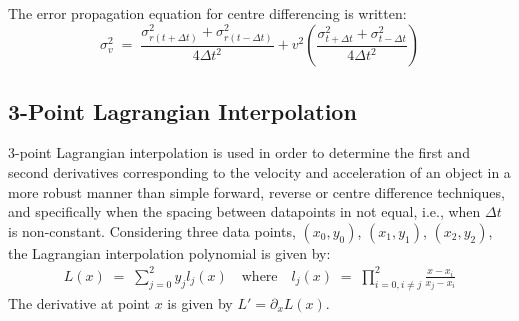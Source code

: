 \documentclass[namedreferences]{SolarPhysics}
\begin{document}
\begin{article}
The error propagation equation for centre differencing is written:
\begin{equation}
\sigma_v^2 \; = \; \frac{\sigma_{r(t+\Delta t)}^2+\sigma_{r(t-\Delta t)}^2}{4 \Delta t^2} + v^2 \left( \frac{\sigma_{t+\Delta t}^2+\sigma_{t-\Delta t}^2}{4 \Delta t^2} \right) %
\end{equation}


\subsection{3-Point Lagrangian Interpolation}
\label{sect_lagrangian}

3-point Lagrangian interpolation is used in order to determine the first and second derivatives corresponding to the velocity and acceleration of an object in a more robust manner than simple forward, reverse or centre difference techniques, and specifically when the spacing between datapoints in not equal, i.e., when $\Delta t$ is non-constant. Considering three data points, $(x_0, y_0)$, $(x_1, y_1)$, $(x_2, y_2)$, the Lagrangian interpolation polynomial is given by:
\begin{eqnarray}
L(x) \; =\; \sum_{j=0}^2 y_j l_j(x) \quad \mbox{where} \quad
l_j(x) \; =\; \prod_{i=0, i\neq j}^2 \frac{x-x_i}{x_j-x_i} 
\end{eqnarray}
The derivative at point $x$ is given by $L'=\partial_x L(x)$. %

\end{article}
\end{document}
